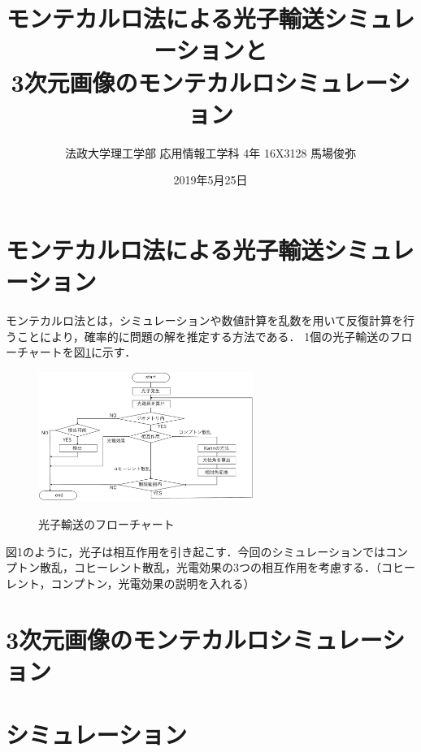\documentclass[dvipdfmx,autodetect-engine,twocolumn,10pt]{jsarticle}%
\title{モンテカルロ法による光子輸送シミュレーションと\\
3次元画像のモンテカルロシミュレーション}
\author{法政大学理工学部 応用情報工学科 4年 16X3128 馬場俊弥}
\date{2019年5月25日}
\begin{document}
\maketitle
\section{モンテカルロ法による光子輸送シミュレーション}
モンテカルロ法とは，シミュレーションや数値計算を乱数を用いて反復計算を行うことにより，確率的に問題の解を推定する方法である．
1個の光子輸送のフローチャートを図\ref{photon_flow}に示す．

\begin{figure}[h]
  \begin{center}
    \includegraphics[width=7cm]{./file/monte_simu_flow.eps}\\
    \caption{光子輸送のフローチャート}
    \label{photon_flow}
  \end{center}
\end{figure}

図1のように，光子は相互作用を引き起こす．今回のシミュレーションではコンプトン散乱，コヒーレント散乱，光電効果の3つの相互作用を考慮する．（コヒーレント，コンプトン，光電効果の説明を入れる）

\section{3次元画像のモンテカルロシミュレーション}


\section{シミュレーション}
\end{document}
